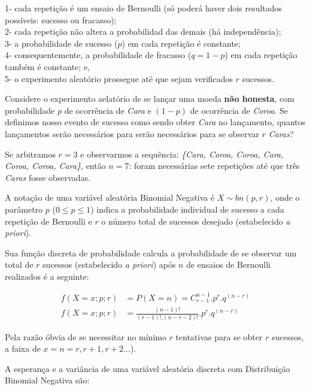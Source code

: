 \documentclass[
]{book}
\begin{document}
1- cada repetição é um ensaio de Bernoulli (só poderá haver dois resultados possíveis: sucesso ou fracasso);\\
2- cada repetição não altera a probabilidad das demais (há independência);\\
3- a probabilidade de sucesso (\(p\)) em cada repetição é constante;\\
4- consequentemente, a probabilidade de fracasso (\(q=1-p\)) em cada repetição também é constante; e,\\
5- o experimento aleatório prossegue até que sejam verificados \(r\) sucessos.

Considere o experimento aelatório de se lançar uma moeda \textbf{não honesta}, com probabilidade \(p\) de ocorrência de \emph{Cara} e \((1-p)\) de ocorrência de \emph{Coroa}. Se definimos nosso evento de sucesso como sendo obter \emph{Cara} no lançamento, quantos lançamentos serão necessários para serão necessários para se observar \(r\) \emph{Caras}?

\hfill\break

Se arbitramos \(r=3\) e observarmos a sequência: \emph{\{Cara, Coroa, Coroa, Cara, Coroa, Coroa, Cara\}}, então \(n=7\): foram necessárias sete repetições até que três \emph{Caras} fosse observadas.

\hfill\break

A notação de uma variável aleatória Binomial Negativa é \(X\sim bn(p,r)\), onde o parâmetro \(p\) (\(0 \le p \le1\)) indica a probabilidade individual de sucesso a cada repetição de Bernoulli e \(r\) o número total de sucessos desejado (estabelecido \emph{a priori}).

\hfill\break

Sua função discreta de probabilidade calcula a probabilidade de se observar um total de \(r\) sucessos (estabelecido \emph{a priori}) após \(n\) de ensaios de Bernoulli realizados é a seguinte:

\begin{align*}
f(X=x; p; r) & = P(X=n) = {C}_{r-1}^{n-1} . {p}^{r} . {q}^{(n-r)} \\
f(X=x; p; r) & = \frac{(n-1)!}{ (r-1)!. (n-r-2)!} . {p}^{r}. {q}^{(n-r)}
\end{align*}

Pela razão óbvia de se necessitar no mínimo \(r\) tentativas para se obter \(r\) sucessos, a faixa de \(x=n={r, r+1, r+2 ...}\)).

\hfill\break

A esperança e a variância de uma variável aleatória discreta com Distribuição Binomial Negativa são:
\end{document}
